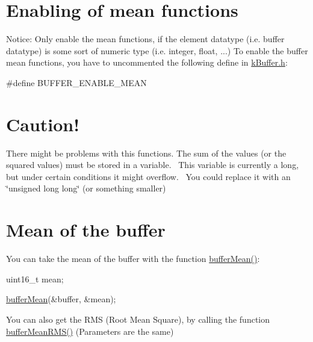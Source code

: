 \hypertarget{mean_enabling}{}\section{Enabling of mean functions}\label{mean_enabling}
Notice\+: Only enable the mean functions, if the element datatype (i.\+e. buffer datatype) is some sort of numeric type (i.\+e. integer, float, ...) To enable the buffer mean functions, you have to uncommented the following define in \hyperlink{k_buffer_8h}{k\+Buffer.\+h}\+: 
\begin{DoxyCode}
\textcolor{preprocessor}{#define BUFFER\_ENABLE\_MEAN}
\end{DoxyCode}
 \hypertarget{mean_caution}{}\section{Caution!}\label{mean_caution}
There might be problems with this functions. The sum of the values (or the squared values) must be stored in a variable.~\newline
 This variable is currently a long, but under certain conditions it might overflow.~\newline
 You could replace it with an \char`\"{}unsigned long long\char`\"{} (or something smaller) \hypertarget{mean_meanfunc}{}\section{Mean of the buffer}\label{mean_meanfunc}
You can take the mean of the buffer with the function \hyperlink{k_buffer_8c_a1389f5c08210e077301c35bc3b43f681}{buffer\+Mean()}\+: 
\begin{DoxyCode}
uint16\_t mean;

\hyperlink{k_buffer_8c_a1389f5c08210e077301c35bc3b43f681}{bufferMean}(&buffer, &mean);
\end{DoxyCode}
 You can also get the R\+MS (Root Mean Square), by calling the function \hyperlink{k_buffer_8c_a1da694b34c0a52809c923d2d149d1348}{buffer\+Mean\+R\+M\+S()} (Parameters are the same) 